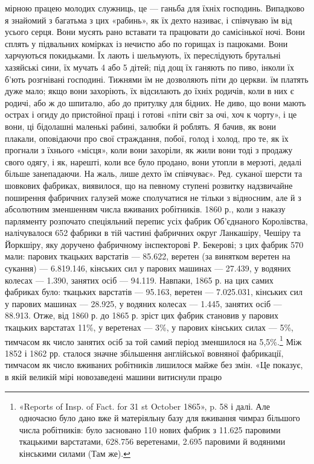 мірною працею молодих служниць, це — ганьба для їхніх господинь.
Випадково я знайомий з багатьма з цих «рабинь», як їх дехто називає,
і співчуваю їм від усього серця. Вони мусять рано вставати та працювати
до самісінької ночі. Вони сплять у підвальних комірках із нечистю або
по горищах із пацюками. Вони харчуються покидьками. Їх лають і шельмують,
їх переслідують брутальні хазяйські сини, їх мучать 4 або 5 дітей;
під дощ їх ганяють по пиво, інколи їх б’ють розгнівані господині. Тижнями
їм не дозволяють піти до церкви. їм платять дуже мало; якщо вони
захоріють, їх відсилають до їхніх родичів, коли в них є родичі, або ж до
шпиталю, або до притулку для бідних. Не диво, що вони мають острах
і огиду до пристойної праці і готові «піти світ за очі, хоч к чорту», і це
вони, ці бідолашні маленькі рабині, залюбки й роблять. Я бачив, як вони
плакали, оповідаючи про свої страждання, побої, голод і холод, про те,
як їх прогнали з їхнього «місця», коли вони захоріли, як жили вони
тоді з продажу свого одягу, і як, нарешті, коли все було продано, вони
утопли в мерзоті, дедалі більше занепадаючи. На жаль, лише дехто їм
співчуває». Ред.
суканої шерсти та шовкових фабриках, виявилося, що на певному
ступені розвитку надзвичайне поширення фабричних галузей
може сполучатися не тільки з відносним, але й з абсолютним
зменшенням числа вживаних робітників. 1860 р., коли з наказу
парляменту розпочато спеціяльний перепис усіх фабрик Об’єднаного
Королівства, налічувалося 652 фабрики в тій частині
фабричних округ Ланкашіру, Чешіру та Йоркшіру, яку доручено
фабричному інспекторові Р. Бекерові; з цих фабрик 570 мали:
парових ткацьких варстатів — 85.622, веретен (за винятком веретен
на сукання) — 6.819.146, кінських сил у парових машинах —
27.439, у водяних колесах — 1.390, занятих осіб — 94.119.
Навпаки, 1865 р. на цих самих фабриках було: ткацьких варстатів
— 95.163, веретен — 7.025.031, кінських сил у парових машинах
— 28.925, у водяних колесах — 1.445, занятих осіб —
88.913. Отже, від 1860 р. до 1865 р. зріст цих фабрик становив
у парових ткацьких варстатах 11\%, у веретенах — 3\%, у парових
кінських силах — 5\%, тимчасом як число занятих осіб за той
самий період зменшилося на 5,5\%.\footnote{
«Reports of Insp. of Fact. for 31 st October 1865», p. 58 і далі.
Але одночасно було дано вже й матеріяльну базу для вживання чимраз
більшого числа робітників: було засновано 110 нових фабрик з 11.625 паровими
ткацькими варстатами, 628.756 веретенами, 2.695 паровими й водяними
кінськими силами (Там же).
} Між 1852 і 1862 рр. сталося
значне збільшення англійської вовняної фабрикації, тимчасом як
число вживаних робітників лишилося майже без змін. «Це показує,
в якій великій мірі новозаведені машини витиснули працю

